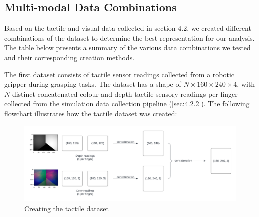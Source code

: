 \documentclass[11pt, a4paper]{report}
\begin{document}
\subsection{Multi-modal Data Combinations}\label{sec:4.4.1}
Based on the tactile and visual data collected in section 4.2, we created different combinations of the dataset to determine the best representation for our analysis. The table below presents a summary of the various data combinations we tested and their corresponding creation methods.
\begin{table}[H]
    \centering
    \caption{Dataset combinations}
    \label{tab:4.1}
\end{table}
The first dataset consists of tactile sensor readings collected from a robotic gripper during grasping tasks. The dataset has a shape of $N\times160\times240\times4$, with $N$ distinct concatenated colour and depth tactile sensory readings per finger collected from the simulation data collection pipeline (\ref{sec:4.2.2}). The following flowchart illustrates how the tactile dataset was created:
\begin{figure}[H]
    \centering
    \includegraphics[width=\textwidth]{docs/Project Report/Media/tactile_dataset_creation.png}
    \caption{Creating the tactile dataset}
    \label{fig:4.7}
\end{figure}
\end{document}
